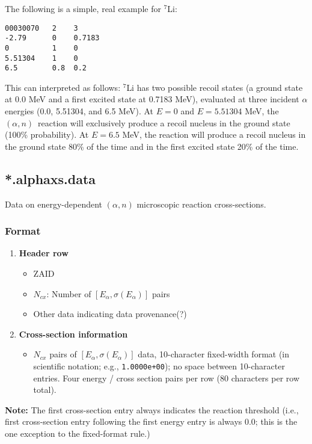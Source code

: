 \documentclass[10pt]{article}
\newcommand{\alphn}[0]{$\left(\alpha,n\right)$}
\begin{document}
The following is a simple, real example for ${}^7$Li:
\begin{Verbatim}[frame=single]
00030070   2    3
-2.79      0    0.7183
0          1    0
5.51304    1    0
6.5        0.8  0.2
\end{Verbatim}

This can interpreted as follows: ${}^7$Li has two possible recoil states (a ground state at 0.0 MeV and a first excited state at 0.7183 MeV), evaluated at three incident $\alpha$ energies (0.0, 5.51304, and 6.5 MeV). At $E=0$ and $E=5.51304$ MeV, the \alphn\ reaction will exclusively produce a recoil nucleus in the ground state (100\% probability). At $E=6.5$ MeV, the reaction will produce a recoil nucleus in the ground state 80\% of the time and in the first excited state 20\% of the time.

\subsection{*.alphaxs.data}

Data on energy-dependent $(\alpha,n)$ microscopic reaction cross-sections.

\subsubsection{Format}
\begin{enumerate}
\item \textbf{Header row}
\begin{itemize}
\item ZAID 
\item $N_{cx}$: Number of $\left[E_\alpha, \sigma \left(E_{\alpha} \right) \right]$ pairs
\item Other data indicating data provenance(?)
\end{itemize}
\item \textbf{Cross-section information}
\begin{itemize}
\item $N_{cx}$ pairs of $\left[E_\alpha, \sigma\left(E_\alpha \right) \right]$ data, 10-character fixed-width format (in scientific notation; e.g., \texttt{1.0000e+00}); no space between 10-character entries. Four energy / cross section pairs per row (80 characters per row total).
\end{itemize}
\end{enumerate}

\textbf{Note:} The first cross-section entry always indicates the reaction threshold (i.e., first cross-section entry following the first energy entry is always 0.0; this is the one exception to the fixed-format rule.)
\end{document}
